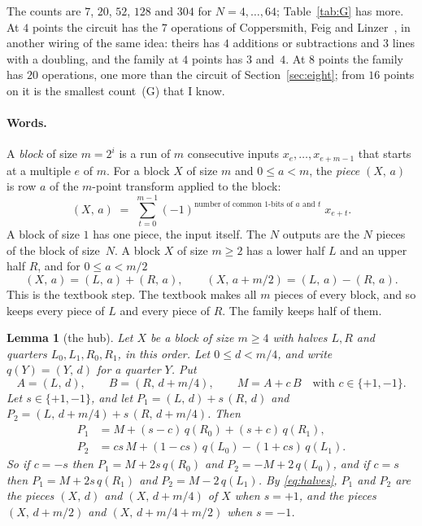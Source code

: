 \documentclass[10pt]{article}
\newtheorem{lemma}[proposition]{Lemma}
\theoremstyle{remark}
\newcommand{\cntG}{\textup{(G)}}
\newcommand{\pc}[2]{(#1,\,#2)}
\begin{document}
The counts are $7$, $20$, $52$, $128$ and $304$ for $N=4,\dots,64$; Table~\ref{tab:G} has more. At $4$ points the circuit has the $7$ operations of Coppersmith, Feig and Linzer~\cite{CFL}, in another
wiring of the same idea: theirs has $4$ additions or subtractions and $3$ lines with a doubling, and the
family at $4$ points has $3$ and~$4$.
At $8$ points the family has $20$ operations, one more than the circuit of Section~\ref{sec:eight}; from
$16$ points on it is the smallest count~\cntG{} that I know.

\paragraph{Words.}
A \emph{block} of size $m=2^i$ is a run of $m$ consecutive inputs $x_e,\dots,x_{e+m-1}$ that starts at a
multiple $e$ of $m$. For a block $X$ of size $m$ and $0\le a<m$, the \emph{piece} $\pc Xa$ is row $a$ of the
$m$-point transform applied to the block:
\[
\pc Xa\;=\;\sum_{t=0}^{m-1}(-1)^{\text{number of common $1$-bits of $a$ and $t$}}\;x_{e+t}.
\]
A block of size $1$ has one piece, the input itself. The $N$ outputs are the $N$ pieces of the block of
size~$N$. A block $X$ of size $m\ge2$ has a lower half $L$ and an upper half $R$, and for $0\le a<m/2$
\begin{equation}\label{eq:halves}
\pc Xa=\pc La+\pc Ra,\qquad \pc X{a+m/2}=\pc La-\pc Ra .
\end{equation}
This is the textbook step. The textbook makes all $m$ pieces of every block, and so keeps every piece of
$L$ and every piece of $R$. The family keeps half of them.

\begin{lemma}[the hub]\label{lem:hub}
Let $X$ be a block of size $m\ge4$ with halves $L,R$ and quarters $L_0,L_1,R_0,R_1$, in this order. Let
$0\le d<m/4$, and write $q(Y)=\pc Yd$ for a quarter $Y$. Put
\[
A=\pc Ld,\qquad B=\pc R{d+m/4},\qquad M=A+c\,B\quad\text{with } c\in\{+1,-1\}.
\]
Let $s\in\{+1,-1\}$, and let $P_1=\pc Ld+s\,\pc Rd$ and $P_2=\pc L{d+m/4}+s\,\pc R{d+m/4}$. Then
\begin{align}
P_1&=M+(s-c)\,q(R_0)+(s+c)\,q(R_1), \label{eq:P1}\\
P_2&=cs\,M+(1-cs)\,q(L_0)-(1+cs)\,q(L_1). \label{eq:P2}
\end{align}
So if $c=-s$ then $P_1=M+2s\,q(R_0)$ and $P_2=-M+2\,q(L_0)$, and if $c=s$ then $P_1=M+2s\,q(R_1)$ and
$P_2=M-2\,q(L_1)$. By \eqref{eq:halves}, $P_1$ and $P_2$ are the pieces $\pc Xd$ and $\pc X{d+m/4}$ of $X$ when
$s=+1$, and the pieces $\pc X{d+m/2}$ and $\pc X{d+m/4+m/2}$ when $s=-1$.
\end{lemma}
\end{document}
